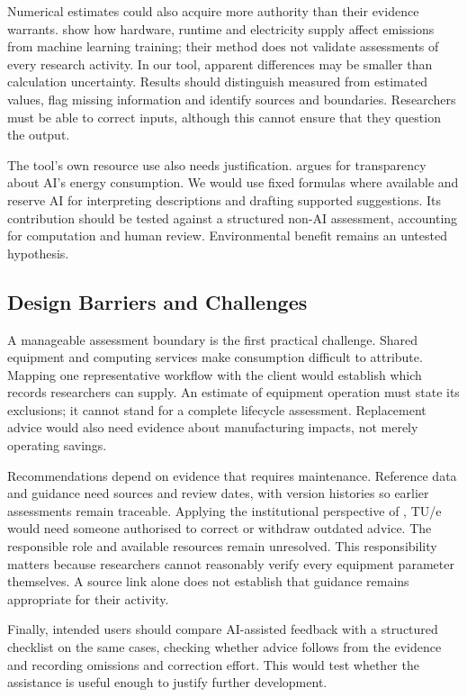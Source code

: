 \documentclass[11pt,a4paper]{article}
\begin{document}
Numerical estimates could also acquire more authority than their evidence warrants. \citet{lacoste2019carbon} show how hardware, runtime and electricity supply affect emissions from machine learning training; their method does not validate assessments of every research activity. In our tool, apparent differences may be smaller than calculation uncertainty. Results should distinguish measured from estimated values, flag missing information and identify sources and boundaries. Researchers must be able to correct inputs, although this cannot ensure that they question the output.

The tool's own resource use also needs justification. \citet{lin2023cost} argues for transparency about AI's energy consumption. We would use fixed formulas where available and reserve AI for interpreting descriptions and drafting supported suggestions. Its contribution should be tested against a structured non-AI assessment, accounting for computation and human review. Environmental benefit remains an untested hypothesis.

\subsection{Design Barriers and Challenges}
\enlargethispage{\baselineskip}

A manageable assessment boundary is the first practical challenge. Shared equipment and computing services make consumption difficult to attribute. Mapping one representative workflow with the client would establish which records researchers can supply. An estimate of equipment operation must state its exclusions; it cannot stand for a complete lifecycle assessment. Replacement advice would also need evidence about manufacturing impacts, not merely operating savings.

Recommendations depend on evidence that requires maintenance. Reference data and guidance need sources and review dates, with version histories so earlier assessments remain traceable. Applying the institutional perspective of \citet{hasselbalch2025sustainability}, TU/e would need someone authorised to correct or withdraw outdated advice. The responsible role and available resources remain unresolved. This responsibility matters because researchers cannot reasonably verify every equipment parameter themselves. A source link alone does not establish that guidance remains appropriate for their activity.

Finally, intended users should compare AI-assisted feedback with a structured checklist on the same cases, checking whether advice follows from the evidence and recording omissions and correction effort. This would test whether the assistance is useful enough to justify further development.
\end{document}
